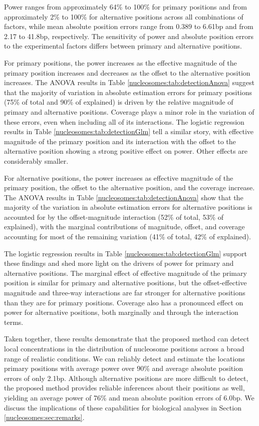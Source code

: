 Power ranges from approximately 64\% to 100\% for primary positions and from approximately 2\% to 100\% for alternative positions across all combinations of factors, while mean absolute position errors range from 0.389 to 6.61bp and from 2.17 to 41.8bp, respectively.
The sensitivity of power and absolute position errors to the experimental factors differs between primary and alternative positions.

For primary positions, the power increases as the effective magnitude of the primary position increases and decreases as the offset to the alternative position increases.
The ANOVA results in Table \ref{nucleosomes:tab:detectionAnova} suggest that the majority of variation in absolute estimation errors for primary positions (75\% of total and 90\% of explained) is driven by the relative magnitude of primary and alternative positions.
Coverage plays a minor role in the variation of these errors, even when including all of its interactions.
The logistic regression results in Table \ref{nucleosomes:tab:detectionGlm} tell a similar story, with effective magnitude of the primary position and its interaction with the offset to the alternative position showing a strong positive effect on power.
Other effects are considerably smaller.

For alternative positions, the power increases as effective magnitude of the primary position, the offset to the alternative position, and the coverage increase.
The ANOVA results in Table \ref{nucleosomes:tab:detectionAnova} show that the majority of the variation in absolute estimation errors for alternative positions is accounted for by the offset-magnitude interaction (52\% of total, 53\% of explained), with the marginal contributions of magnitude, offset, and coverage accounting for most of the remaining variation (41\% of total, 42\% of explained).

The logistic regression results in Table \ref{nucleosomes:tab:detectionGlm} support these findings and shed more light on the drivers of power for primary and alternative positions.
The marginal effect of effective magnitude of the primary position is similar for primary and alternative positions, but the offset-effective magnitude and three-way interactions are far stronger for alternative positions than they are for primary positions.
Coverage also has a pronounced effect on power for alternative positions, both marginally and through the interaction terms.

Taken together, these results demonstrate that the proposed method can detect local concentrations in the distribution of nucleosome positions across a broad range of realistic conditions.
We can reliably detect and estimate the locations primary positions with average power over 90\% and average absolute position errors of only 2.1bp.
Although alternative positions are more difficult to detect, the proposed method provides reliable inferences about their positions as well, yielding an average power of 76\% and mean absolute position errors of 6.0bp.
We discuss the implications of these capabilities for biological analyses in Section \ref{nucleosomes:sec:remarks}.

